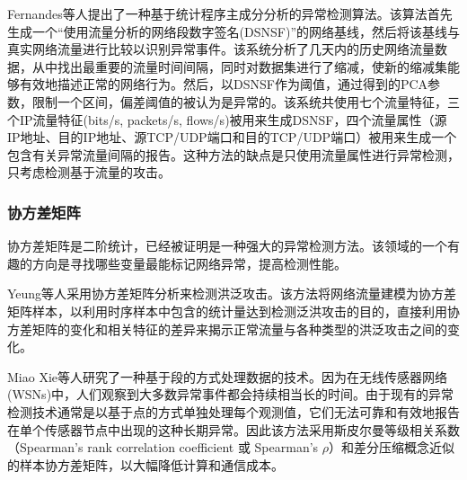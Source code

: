 Fernandes等人\cite{fernandes2016network}提出了一种基于统计程序主成分分析的异常检测算法。该算法首先生成一个“使用流量分析的网络段数字签名(DSNSF)”的网络基线，然后将该基线与真实网络流量进行比较以识别异常事件。该系统分析了几天内的历史网络流量数据，从中找出最重要的流量时间间隔，同时对数据集进行了缩减，使新的缩减集能够有效地描述正常的网络行为。然后，以DSNSF作为阈值，通过得到的PCA参数，限制一个区间，偏差阈值的被认为是异常的。该系统共使用七个流量特征，三个IP流量特征(bits/s, packets/s, flows/s)被用来生成DSNSF，四个流量属性（源IP地址、目的IP地址、源TCP/UDP端口和目的TCP/UDP端口）被用来生成一个包含有关异常流量间隔的报告。这种方法的缺点是只使用流量属性进行异常检测，只考虑检测基于流量的攻击。


\subsubsection{协方差矩阵}

协方差矩阵是二阶统计，已经被证明是一种强大的异常检测方法。该领域的一个有趣的方向是寻找哪些变量最能标记网络异常，提高检测性能。

Yeung等人\cite{yeung2007covariance}采用协方差矩阵分析来检测洪泛攻击。该方法将网络流量建模为协方差矩阵样本，以利用时序样本中包含的统计量达到检测泛洪攻击的目的，直接利用协方差矩阵的变化和相关特征的差异来揭示正常流量与各种类型的洪泛攻击之间的变化。


 Miao Xie等人\cite{xie2014segment}研究了一种基于段的方式处理数据的技术。因为在无线传感器网络(WSNs)中，人们观察到大多数异常事件都会持续相当长的时间。由于现有的异常检测技术通常是以基于点的方式单独处理每个观测值，它们无法可靠和有效地报告在单个传感器节点中出现的这种长期异常。因此该方法采用斯皮尔曼等级相关系数（Spearman's rank correlation coefficient 或 Spearman's $\rho$）和差分压缩概念近似的样本协方差矩阵，以大幅降低计算和通信成本。






